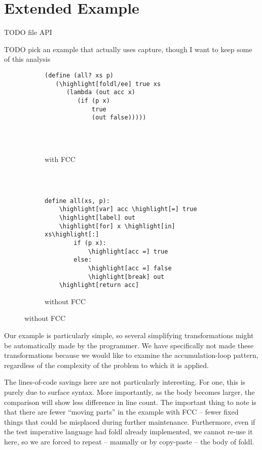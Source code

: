 \documentclass[11pt]{article}
\newcommand{\highlight}[1]{\colorbox{black!30!white}{#1}}
\begin{document}
\section{Extended Example}
\label{sec:foldl/ee}

TODO file API

TODO pick an example that actually uses capture, though I want to keep some of this analysis

\begin{figure}[H]
\caption{Accumulation-loop pattern codified}
\label{fig:foldl/ee}


\begin{subfigure}[b]{0.5\textwidth}
\begin{Verbatim}[commandchars=\\\[\]]
(define (all? xs p)
   (\highlight[foldl/ee] true xs
      (lambda (out acc x)
         (if (p x)
             true
             (out false)))))




\end{Verbatim}
\caption{with FCC}
\end{subfigure}
~
\begin{subfigure}[b]{0.5\textwidth}
\begin{Verbatim}[commandchars=\\\[\]]

define all(xs, p):
    \highlight[var] acc \highlight[=] true
    \highlight[label] out
    \highlight[for] x \highlight[in] xs\highlight[:]
        if (p x):
            \highlight[acc =] true
        else:
            \highlight[acc =] false
            \highlight[break] out
    \highlight[return acc]
\end{Verbatim}
\caption{without FCC}
\end{subfigure}


\end{figure}

Our example is particularly simple, so several simplifying transformations might be automatically made by the programmer.
We have specifically not made these transformations because we would like to examine the accumulation-loop pattern, regardless of the complexity of the problem to which it is applied.

The lines-of-code savings here are not particularly interesting.
For one, this is purely due to surface syntax.
More importantly, as the body becomes larger, the comparison will show less difference in line count.
The important thing to note is that there are fewer ``moving parts'' in the example with FCC -- fewer fixed things that could be misplaced during further maintenance.
Furthermore, even if the test imperative language had foldl already implemented, we cannot re-use it here, so we are forced to repeat -- manually or by copy-paste -- the body of foldl.
\end{document}
